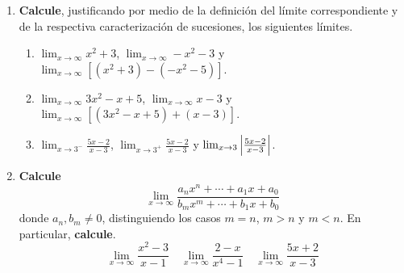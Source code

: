 \documentclass[12pt]{article}
\begin{document}
\begin{enumerate}
    \begin{sol}
    \end{sol}

    \item \textbf{Calcule}, justificando por medio de la definición del límite correspondiente y de la respectiva caracterización de sucesiones, los siguientes límites.
    \begin{enumerate}
        \item $\lim_{x\rightarrow\infty}x^2+3$, $\lim_{x\rightarrow\infty}-x^2-3$ y $\lim_{x\rightarrow\infty}[(x^2+3)-(-x^2-5)]$.
        \item $\lim_{x\rightarrow\infty}3x^2-x+5$, $\lim_{x\rightarrow\infty}x-3$ y $\lim_{x\rightarrow\infty}[(3x^2-x+5)+(x-3)]$.
        \item $\lim_{x\rightarrow3^-}\frac{5x-2}{x-3}$, $\lim_{x\rightarrow3^+}\frac{5x-2}{x-3}$ y $\lim_{x\rightarrow3}\left| \frac{5x-2}{x-3} \right|$.
    \end{enumerate}

    \begin{sol}
    \end{sol}

    \item \textbf{Calcule}
    \begin{equation*}
        \lim_{ x\rightarrow\infty}\frac{a_nx^n+\cdots+a_1x+a_0}{b_mx^m+\cdots+b_1x+b_0}
    \end{equation*}
    donde $a_n,b_m\neq0$, distinguiendo los casos $m=n$, $m>n$ y $m<n$. En particular, \textbf{calcule}.
    \begin{equation*}
        \lim_{ x\rightarrow\infty}\frac{x^2-3}{x-1}\quad\lim_{ x\rightarrow\infty}\frac{2-x}{x^4-1}\quad\lim_{ x\rightarrow\infty}\frac{5x+2}{x-3}
    \end{equation*}

    \begin{sol}
    \end{sol}


\end{enumerate}
\end{document}
